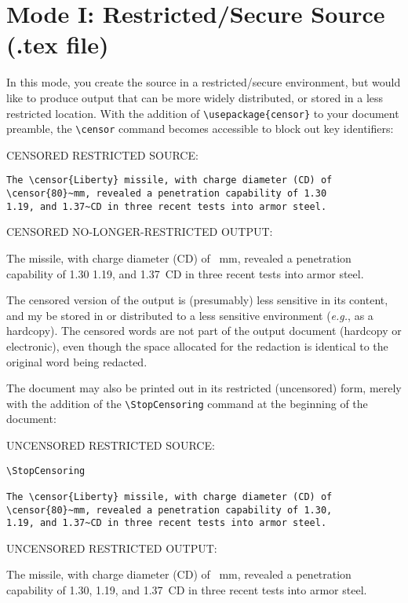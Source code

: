 \documentclass{article}
\begin{document}
\clearpage
\section{Mode I: Restricted/Secure Source (.tex file)}

In this mode, you create the source in a restricted/secure environment,
but would like to produce output that can be more widely distributed, or
stored in a less restricted location.  With the addition of
\verb|\usepackage{censor}| to your document preamble, the \verb|\censor|
command becomes accessible to block out key identifiers:

{\addtolength{\leftskip}{2.3em}
CENSORED RESTRICTED SOURCE: \hrulefill

\verb|The \censor{Liberty} missile, with charge diameter (CD) of|\\
\verb|\censor{80}~mm, revealed a penetration capability of 1.30|\\
\verb|1.19, and 1.37~CD in three recent tests into armor steel.|

CENSORED NO-LONGER-RESTRICTED OUTPUT: \hrulefill

The  missile, with charge diameter (CD) of
~mm, revealed a penetration capability of 1.30 1.19, and
1.37~CD in three recent tests into armor steel.

\hrulefill

}

The censored version of the output is (presumably) less sensitive in its
content, and my be stored in or distributed to a less sensitive
environment (\textit{e.g.}, as a hardcopy).  The censored words are not part
of the output document (hardcopy or electronic), even though the space
allocated for the redaction is identical to the original word being
redacted.

The document may also be printed out in its restricted (uncensored)
form, merely with the addition of the \verb|\StopCensoring| command at
the beginning of the document:

{\addtolength{\leftskip}{2.3em}
UNCENSORED RESTRICTED SOURCE: \hrulefill

\verb|\StopCensoring|\\
\verb| |\\
\verb|The \censor{Liberty} missile, with charge diameter (CD) of|\\
\verb|\censor{80}~mm, revealed a penetration capability of 1.30,|\\
\verb|1.19, and 1.37~CD in three recent tests into armor steel.|

UNCENSORED RESTRICTED OUTPUT: \hrulefill

\StopCensoring

The  missile, with charge diameter (CD) of
~mm, revealed a penetration capability of 1.30, 1.19, and
1.37~CD in three recent tests into armor steel.

\hrulefill

}
\end{document}
